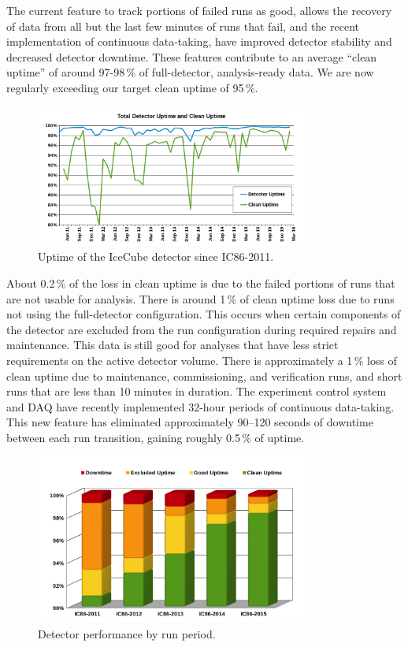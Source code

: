 
The current feature to track portions of failed runs as good, allows the recovery of data from all but the last few minutes of runs that fail, and the recent implementation of continuous data-taking, have improved detector stability and decreased detector downtime. These features contribute to an average “clean uptime” of around 97-98\,\% of full-detector, analysis-ready data. We are now regularly exceeding our target clean uptime of 95\,\%.

\begin{figure}[!h]
 \centering
 \includegraphics[width=0.8\textwidth]{graphics/uptime/clean-uptime.png}
 \caption{Uptime of the IceCube detector since IC86-2011.}
 \label{fig:clean-uptime}
\end{figure}

About 0.2\,\% of the loss in clean uptime is due to the failed portions of runs that are not usable for analysis. There is around 1\,\% of clean uptime loss due to runs not using the full-detector configuration. This occurs when certain components of the detector are excluded from the run configuration during required repairs and maintenance. This data is still good for analyses that have less strict requirements on the active detector volume. There is approximately a 1\,\% loss of clean uptime due to maintenance, commissioning, and verification runs, and short runs that are less than 10 minutes in duration. The experiment control system and DAQ have recently implemented 32-hour periods of continuous data-taking. This new feature has eliminated approximately 90–120 seconds of downtime between each run transition, gaining roughly 0.5\,\% of uptime.

\begin{figure}[!h]
	\centering
	\includegraphics[width=0.8\textwidth]{graphics/uptime/bar-chart.png}
	\caption{Detector performance by run period.}
	\label{fig:period-performace}
\end{figure}


